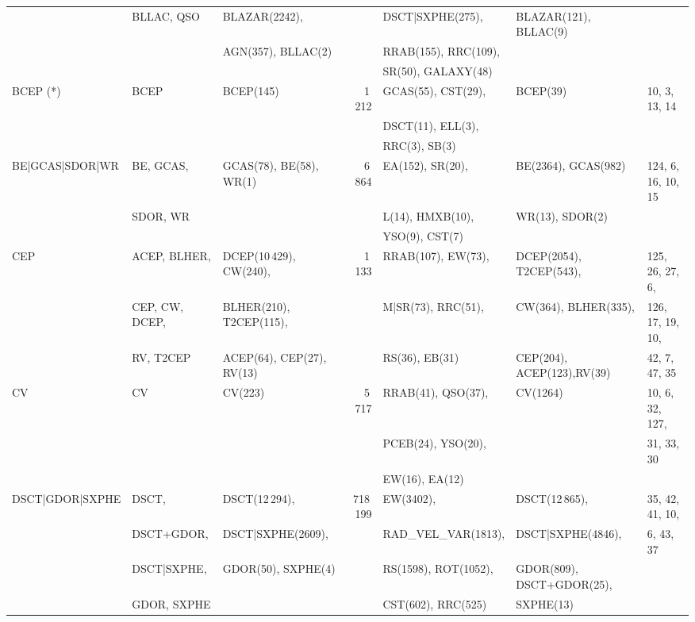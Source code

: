\documentclass[longauth]{aa}
\begin{document}
\begin{landscape}
\begin{table}
\begin{tabular}{@{}lllrlll@{}}
    & BLLAC, QSO & BLAZAR(2242),     &  & DSCT|SXPHE(275), & BLAZAR(121), BLLAC(9) &   \\
    &            & AGN(357), BLLAC(2) &  & RRAB(155), RRC(109),  &  &   \\
    &            &                    &  & SR(50), GALAXY(48) &  &   \\
BCEP (*) & BCEP & BCEP(145) & 1\,212 & GCAS(55), CST(29),  & BCEP(39) & 10, 3, 13, 14  \\
         &      &           &        & DSCT(11), ELL(3),  &  &   \\
         &      &           &        & RRC(3), SB(3)  &  &   \\
BE|GCAS|SDOR|WR & BE, GCAS,      & GCAS(78), BE(58), WR(1) & 6\,864 & EA(152), SR(20), & BE(2364), GCAS(982) & 124, 6, 16, 10, 15  \\
                & SDOR, WR       &                         &        & L(14), HMXB(10), & WR(13), SDOR(2) &   \\
                &                &                         &        & YSO(9), CST(7) &  &   \\
CEP & ACEP, BLHER,  & DCEP(10\,429), CW(240), & 1\,133 & RRAB(107), EW(73), & DCEP(2054), T2CEP(543), & 125, 26, 27, 6, \\
    & CEP, CW, DCEP,  & BLHER(210), T2CEP(115), &  & M|SR(73), RRC(51), & CW(364), BLHER(335), & 126, 17, 19, 10, \\
    & RV, T2CEP               & ACEP(64), CEP(27), RV(13) &  & RS(36), EB(31) & CEP(204), ACEP(123),RV(39) & 42, 7, 47, 35 \\
CV & CV & CV(223) & 5\,717 & RRAB(41), QSO(37), & CV(1264) & 10, 6, 32, 127, \\
   &    &         &        & PCEB(24), YSO(20), &  & 31, 33, 30  \\
   &    &         &        & EW(16), EA(12) &  &   \\
DSCT|GDOR|SXPHE & DSCT,           & DSCT(12\,294),       & 718\,199 & EW(3402),            & DSCT(12\,865),  & 35, 42, 41, 10,  \\
                & DSCT+GDOR,       & DSCT|SXPHE(2609),  &          & RAD\_VEL\_VAR(1813), & DSCT|SXPHE(4846), & 6, 43, 37  \\
                & DSCT|SXPHE,       & GDOR(50), SXPHE(4) &          & RS(1598), ROT(1052), & GDOR(809), DSCT+GDOR(25), &   \\
                & GDOR, SXPHE        &                    &          &  CST(602), RRC(525) & SXPHE(13) &   \\

\end{tabular}
\end{table}
\end{landscape}
\end{document}
